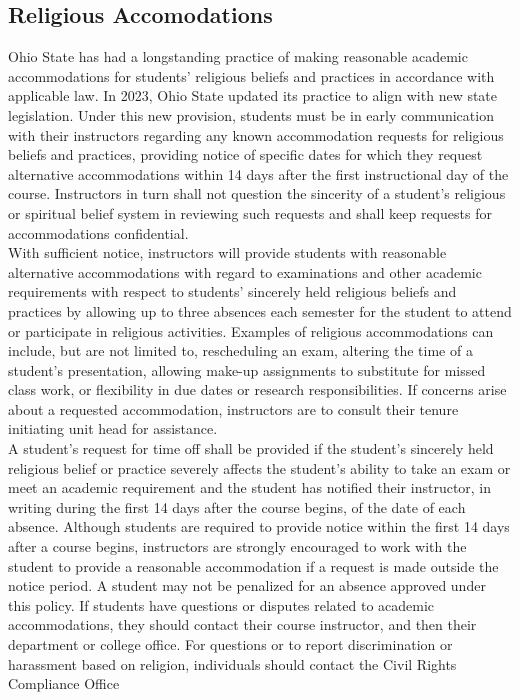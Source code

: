 \documentclass{ximera}
\begin{document}
\subsection*{Religious Accomodations}
Ohio State has had a longstanding practice of making reasonable academic accommodations for students' religious beliefs and practices in accordance with applicable law. In 2023, Ohio State updated its practice to align with new state legislation. Under this new provision, students must be in early communication with their instructors regarding any known accommodation requests for religious beliefs and practices, providing notice of specific dates for which they request alternative accommodations within 14 days after the first instructional day of the course. Instructors in turn shall not question the sincerity of a student's religious or spiritual belief system in reviewing such requests and shall keep requests for accommodations confidential.\\
With sufficient notice, instructors will provide students with reasonable alternative accommodations with regard to examinations and other academic requirements with respect to students' sincerely held religious beliefs and practices by allowing up to three absences each semester for the student to attend or participate in religious activities. Examples of religious accommodations can include, but are not limited to, rescheduling an exam, altering the time of a student's presentation, allowing make-up assignments to substitute for missed class work, or flexibility in due dates or research responsibilities. If concerns arise about a requested accommodation, instructors are to consult their tenure initiating unit head for assistance.\\
A student's request for time off shall be provided if the student's sincerely held religious belief or practice severely affects the student's ability to take an exam or meet an academic requirement and the student has notified their instructor, in writing during the first 14 days after the course begins, of the date of each absence. Although students are required to provide notice within the first 14 days after a course begins, instructors are strongly encouraged to work with the student to provide a reasonable accommodation if a request is made outside the notice period. A student may not be penalized for an absence approved under this policy. If students have questions or disputes related to academic accommodations, they should contact their course instructor, and then their department or college office. For questions or to report discrimination or harassment based on religion, individuals should contact the Civil Rights Compliance Office
\end{document}
